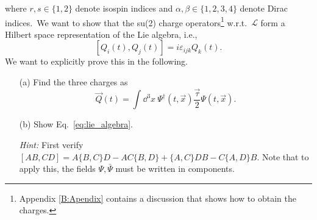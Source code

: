 \documentclass[11pt]{latex/exercise}
\begin{document}
where $r,s \in \{1,2\}$ denote isospin indices and $\alpha,\beta \in \{1,2,3,4\}$ denote Dirac indices.~We want to show that the su(2) charge operators\footnote{Appendix \ref{B:Apendix} contains a discussion that shows how to obtain the charges.} w.r.t.\ $\mathcal{L}$ form a Hilbert space representation of the Lie algebra, i.e.,
\begin{equation}
    \label{eq:lie_algebra}
    [Q_i(t), Q_j(t)] = i \varepsilon_{ijk} Q_k(t) .
\end{equation}
We want to explicitly prove this in the following.

\begin{itemize}
    \item[(a)]
          Find the three charges as
          \begin{equation}
              \vec{Q}(t) = \int \dd^3 x \: \Psi^\dagger(t, \vec x) \frac{\vec\tau}{2} \Psi(t, \vec x) .
          \end{equation}

    \item[(b)]
          Show Eq.~\eqref{eq:lie_algebra}.

          \textit{Hint:} First verify $[AB,CD] = A \{B,C\} D - A C \{B,D\} + \{A,C\} D B - C \{A,D\} B$. Note that to apply this, the fields $\Psi, \bar\Psi$ must be written in components.
\end{itemize}
\end{document}
